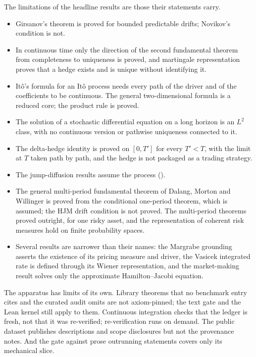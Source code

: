 \documentclass[11pt]{article}
\begin{document}
The limitations of the headline results are those their statements carry.
\begin{itemize}
\item Girsanov's theorem is proved for bounded predictable drifts; Novikov's condition is not.
\item In continuous time only the direction of the second fundamental theorem from completeness to uniqueness is proved,
  and martingale representation proves that a hedge exists and is unique without identifying it.
\item It\^o's formula for an It\^o process needs every path of the driver and of the coefficients to be continuous. The
  general two-dimensional formula is a reduced core; the product rule is proved.
\item The solution of a stochastic differential equation on a long horizon is an $L^2$ class, with no continuous version or
  pathwise uniqueness connected to it.
\item The delta-hedge identity is proved on $[0,T']$ for every $T'<T$, with the limit at $T$ taken path by path, and the
  hedge is not packaged as a trading strategy.
\item The jump-diffusion results assume the process ().
\item The general multi-period fundamental theorem of Dalang, Morton and Willinger is proved from the conditional one-period
  theorem, which is assumed; the HJM drift condition is not proved. The multi-period theorems proved outright, for one risky
  asset, and the representation of coherent risk measures hold on finite probability spaces.
\item Several results are narrower than their names: the Margrabe grounding asserts the existence of its pricing measure and
  driver, the Vasicek integrated rate is defined through its Wiener representation, and the market-making result solves only
  the approximate Hamilton--Jacobi equation.
\end{itemize}

The apparatus has limits of its own. Library theorems that no benchmark entry cites and the curated audit omits are not
axiom-pinned; the text gate and the Lean kernel still apply to them. Continuous integration checks that the ledger is fresh,
not that it was re-verified; re-verification runs on demand. The public dataset publishes descriptions and scope disclosures
but not the provenance notes. And the gate against prose outrunning statements covers only its mechanical slice.
\end{document}
